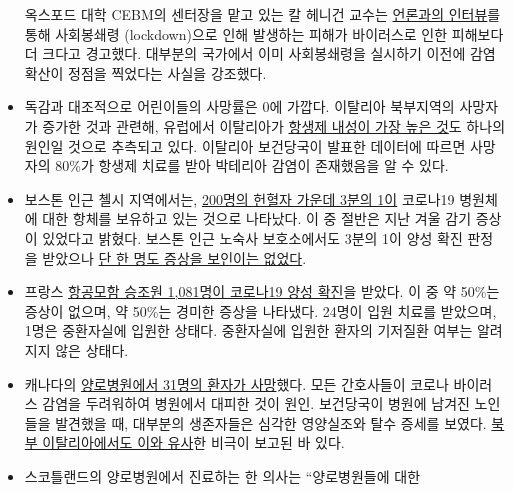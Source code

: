 \begin{itemize}
  옥스포드 대학 CEBM의 센터장을 맡고 있는 칼 헤니건 교수는
  \href{https://news.yahoo.com/lockdown-damage-outweighs-coronavirus-warning-121940675.html}{언론과의
  인터뷰}를 통해 사회봉쇄령 (lockdown)으로 인해 발생하는 피해가
  바이러스로 인한 피해보다 더 크다고 경고했다. 대부분의 국가에서 이미
  사회봉쇄령을 실시하기 이전에 감염 확산이 정점을 찍었다는 사실을
  강조했다.
\item
  독감과 대조적으로 어린이들의 사망률은 0에 가깝다. 이탈리아 북부지역의
  사망자가 증가한 것과 관련해, 유럽에서 이탈리아가
  \href{https://www.ansa.it/english/news/science_tecnology/2019/11/19/italy-top-in-eu-in-antibiotic-resistance_369e0123-0107-445e-8c17-f11932c9d27c.html}{항생제
  내성이 가장 높은 것}도 하나의 원인일 것으로 추측되고 있다. 이탈리아
  보건당국이 발표한 데이터에 따르면 사망자의 80\%가 항생제 치료를 받아
  박테리아 감염이 존재했음을 알 수 있다.
\item
  보스톤 인근 첼시 지역에서는,
  \href{https://archive.is/20200418222442/https:/www.bostonglobe.com/2020/04/17/business/nearly-third-200-blood-samples-taken-chelsea-show-exposure-coronavirus/}{200명의
  헌혈자 가운데 3분의 1이} 코로나19 병원체에 대한 항체를 보유하고 있는
  것으로 나타났다. 이 중 절반은 지난 겨울 감기 증상이 있었다고 밝혔다.
  보스톤 인근 노숙사 보호소에서도 3분의 1이 양성 확진 판정을 받았으나
  \href{https://www.wsbtv.com/news/trending/coronavirus-cdc-reviewing-stunning-universal-testing-results-boston-homeless-shelter/ZADQ45HCAZEVJAZA3OTCUR7M6M/}{단
  한 명도 증상을 보인이는 없었다}. 
\item
  프랑스
  \href{https://www.ouest-france.fr/sante/virus/coronavirus/coronavirus-au-moins-940-marins-positifs-sur-le-charles-de-gaulle-et-son-escorte-6810816}{항공모함
  승조원 1,081명이 코로나19 양성 확진}을 받았다. 이 중 약 50\%는 증상이
  없으며, 약 50\%는 경미한 증상을 나타냈다. 24명이 입원 치료를 받았으며,
  1명은 중환자실에 입원한 상태다. 중환자실에 입원한 환자의 기저질환
  여부는 알려지지 않은 상태다.
\item
  캐나다의
  \href{https://www.nytimes.com/2020/04/16/world/canada/montreal-nursing-homes-coronavirus.html}{양로병원에서
  31명의 환자가 사망}했다. 모든 간호사들이 코로나 바이러스 감염을
  두려워하여 병원에서 대피한 것이 원인. 보건당국이 병원에 남겨진
  노인들을 발견했을 때, 대부분의 생존자들은 심각한 영양실조와 탈수
  증세를 보였다.
  \href{https://swprs.org/covid-19-a-report-from-italy/}{북부
  이탈리아에서도 이와 유사}한 비극이 보고된 바 있다. 
\item
  스코틀랜드의 양로병원에서 진료하는 한 의사는 ``양로병원들에 대한

\end{itemize}
